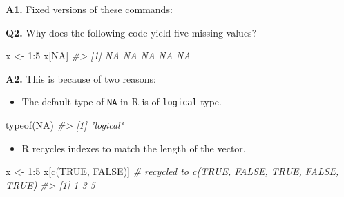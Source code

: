 \documentclass[
]{book}
\newenvironment{Shaded}{\begin{snugshade}}{\end{snugshade}}
\newcommand{\CommentTok}[1]{\textcolor[rgb]{0.56,0.35,0.01}{\textit{#1}}}
\newcommand{\ConstantTok}[1]{\textcolor[rgb]{0.00,0.00,0.00}{#1}}
\newcommand{\DecValTok}[1]{\textcolor[rgb]{0.00,0.00,0.81}{#1}}
\newcommand{\FunctionTok}[1]{\textcolor[rgb]{0.00,0.00,0.00}{#1}}
\newcommand{\NormalTok}[1]{#1}
\newcommand{\OtherTok}[1]{\textcolor[rgb]{0.56,0.35,0.01}{#1}}
\newcommand{\SpecialCharTok}[1]{\textcolor[rgb]{0.00,0.00,0.00}{#1}}
\providecommand{\tightlist}{%
  \setlength{\itemsep}{0pt}\setlength{\parskip}{0pt}}
\begin{document}
\textbf{A1.} Fixed versions of these commands:

\begin{Shaded}
\end{Shaded}

\textbf{Q2.} Why does the following code yield five missing values?

\begin{Shaded}
\begin{Highlighting}[]
\NormalTok{x }\OtherTok{\textless{}{-}} \DecValTok{1}\SpecialCharTok{:}\DecValTok{5}
\NormalTok{x[}\ConstantTok{NA}\NormalTok{]}
\CommentTok{\#\textgreater{} [1] NA NA NA NA NA}
\end{Highlighting}
\end{Shaded}

\textbf{A2.} This is because of two reasons:

\begin{itemize}
\tightlist
\item
  The default type of \texttt{NA} in R is of \texttt{logical} type.
\end{itemize}

\begin{Shaded}
\begin{Highlighting}[]
\FunctionTok{typeof}\NormalTok{(}\ConstantTok{NA}\NormalTok{)}
\CommentTok{\#\textgreater{} [1] "logical"}
\end{Highlighting}
\end{Shaded}

\begin{itemize}
\tightlist
\item
  R recycles indexes to match the length of the vector.
\end{itemize}

\begin{Shaded}
\begin{Highlighting}[]
\NormalTok{x }\OtherTok{\textless{}{-}} \DecValTok{1}\SpecialCharTok{:}\DecValTok{5}
\NormalTok{x[}\FunctionTok{c}\NormalTok{(}\ConstantTok{TRUE}\NormalTok{, }\ConstantTok{FALSE}\NormalTok{)] }\CommentTok{\# recycled to c(TRUE, FALSE, TRUE, FALSE, TRUE)}
\CommentTok{\#\textgreater{} [1] 1 3 5}
\end{Highlighting}
\end{Shaded}
\end{document}
